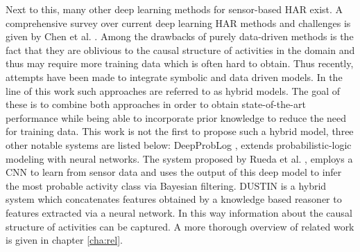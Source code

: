 \documentclass[11pt,titlepage,oneside,openany]{book}
\begin{document}
Next to this, many other deep learning methods for sensor-based HAR exist. A comprehensive survey over current deep learning HAR methods and challenges is given by Chen et al. \cite{chen_deep_2022}. Among the drawbacks of purely data-driven methods is the fact that they are oblivious to the causal structure of activities in the domain and thus may require more training data which is often hard to obtain. Thus recently, attempts have been made to integrate symbolic and data driven models. In the line of this work such approaches are referred to as hybrid models. The goal of these is to combine both approaches in order to obtain state-of-the-art performance while being able to incorporate prior knowledge to reduce the need for training data. This work is not the first to propose such a hybrid model, three other notable systems are listed below: DeepProbLog \cite{manhaeve_deepproblog_2018}, extends probabilistic-logic modeling with neural networks. The system proposed by Rueda et al. \cite{rueda_combining_2019}, employs a CNN to learn from sensor data and uses the output of this deep model to infer the most probable activity class via Bayesian filtering. DUSTIN \cite{arrotta_knowledge_2022} is a hybrid system which concatenates features obtained by a knowledge based reasoner to features extracted via a neural network. In this way information about the causal structure of activities can be captured. A more thorough overview of related work is given in chapter \ref{cha:rel}.
\end{document}

